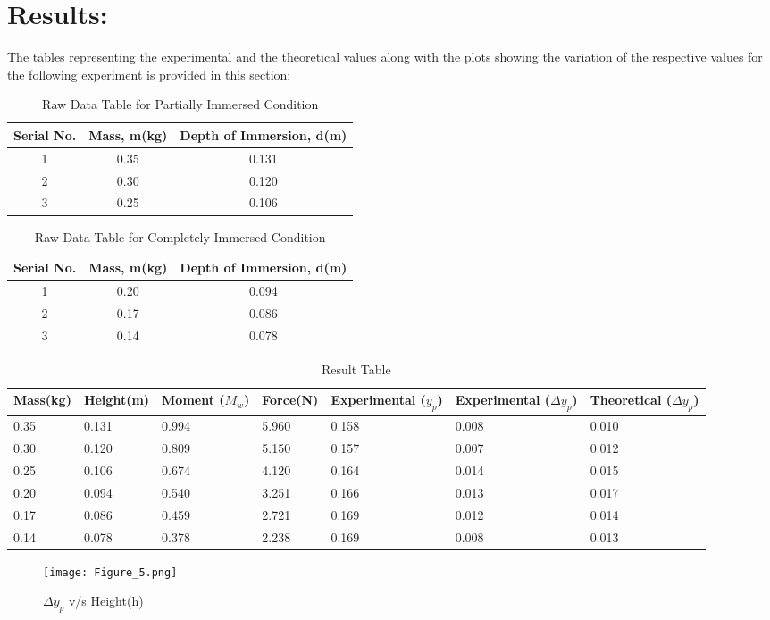 \documentclass[12pt,a4paper]{article}
\begin{document}
\section{Results:}
The tables representing the experimental and the theoretical values along with the plots showing the variation of the respective values for the following experiment is provided in this section:
\begin{table}[h]
\begin{center}
\begin{tabular}{|c|c|c|}
\hline
Serial No. & Mass, m(kg) & Depth of Immersion, d(m) \\
\hline
1 & 0.35 & 0.131  \\
2 & 0.30 & 0.120  \\
3 & 0.25 & 0.106  \\
\hline
\end{tabular}
\caption{Raw Data Table for Partially Immersed Condition}
\label{tab:progs}
\end{center}
\end{table}
\begin{table}[h]
\begin{center}
\begin{tabular}{|c|c|c|}
\hline
Serial No. & Mass, m(kg) & Depth of Immersion, d(m) \\
\hline
1 & 0.20 & 0.094 \\
2 & 0.17 & 0.086 \\
3 & 0.14 & 0.078\\
\hline
\end{tabular}
\caption{Raw Data Table for Completely Immersed Condition}
\label{tab:progs}
\end{center}
\end{table}
\clearpage
\begin{table}
\begin{center}
\begin{tabular}{|p{2cm}|p{2cm}|p{2cm}|p{2cm}|p{2.5cm}|p{2.5cm}|p{2.5cm}|}
\hline
Mass(kg) & Height(m) & Moment ($M_w$) & Force(N) & Experimental ($y_p$) & Experimental ($\Delta$$y_p$) & Theoretical ($\Delta$$y_p$) \\ 
\hline
0.35&0.131&0.994&5.960&0.158&0.008&0.010\\
0.30&0.120&0.809&5.150&0.157&0.007&0.012\\
0.25&0.106&0.674&4.120&0.164&0.014&0.015\\
0.20&0.094&0.540&3.251&0.166&0.013&0.017\\
0.17&0.086&0.459&2.721&0.169&0.012&0.014\\
0.14&0.078&0.378&2.238&0.169&0.008&0.013\\
\hline
\end{tabular}
\caption{Result Table}
\label{Result Table}
\end{center}
\end{table}
\begin{figure}[!ht]
	\begin{center}
			\texttt{[image: Figure\_5.png]}
	\end{center}
	\caption{$\Delta$$y_p$ v/s Height(h)}
	\label{$\Delta$$y_p$ v/s Height(h)}
\end{figure}
\end{document}

